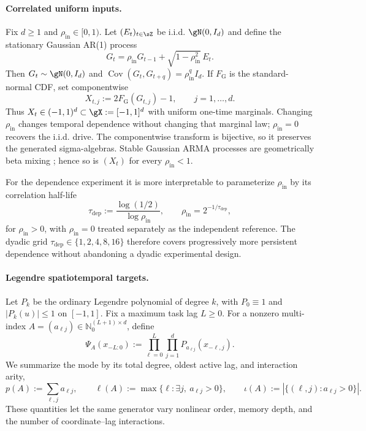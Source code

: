 \paragraph{Correlated uniform inputs.}
Fix $d\geq1$ and $\rho_{\mathrm{in}}\in[0,1)$.  Let
$(E_t)_{t\in\sZ}$ be i.i.d. $\gN(0,I_d)$ and define the stationary Gaussian
AR(1) process
\begin{equation}
    G_t=\rho_{\mathrm{in}}G_{t-1}
      +\sqrt{1-\rho_{\mathrm{in}}^2}\,E_t.
    \label{eq:empirical-gaussian-ar}
\end{equation}
Then $G_t\sim\gN(0,I_d)$ and
$\operatorname{Cov}(G_t,G_{t+q})=\rho_{\mathrm{in}}^qI_d$.  If
$F_{\mathrm G}$ is the standard-normal CDF, set componentwise
\begin{equation}
    X_{t,j}:=2F_{\mathrm G}(G_{t,j})-1,
    \qquad j=1,\ldots,d.
    \label{eq:empirical-uniform-transform}
\end{equation}
Thus $X_t\in(-1,1)^d\subset\gX:=[-1,1]^d$ with uniform one-time marginals.
Changing $\rho_{\mathrm{in}}$ changes temporal dependence without changing
that marginal law; $\rho_{\mathrm{in}}=0$ recovers the i.i.d. drive.  The
componentwise transform is bijective, so it preserves the generated
sigma-algebras.  Stable Gaussian ARMA processes are geometrically beta mixing
\citep{Mokkadem1988}; hence so is $(X_t)$ for every
$\rho_{\mathrm{in}}<1$.

For the dependence experiment it is more interpretable to parameterize
$\rho_{\mathrm{in}}$ by its correlation half-life
\begin{equation}
    \tau_{\mathrm{dep}}
    :=\frac{\log(1/2)}{\log \rho_{\mathrm{in}}},
    \qquad
    \rho_{\mathrm{in}}=2^{-1/\tau_{\mathrm{dep}}},
    \label{eq:dependence-half-life}
\end{equation}
for $\rho_{\mathrm{in}}>0$, with $\rho_{\mathrm{in}}=0$ treated separately as
the independent reference.  The dyadic grid
$\tau_{\mathrm{dep}}\in\{1,2,4,8,16\}$ therefore covers progressively more
persistent dependence without abandoning a dyadic experimental design.

\paragraph{Legendre spatiotemporal targets.}
Let $P_k$ be the ordinary Legendre polynomial of degree $k$, with
$P_0\equiv1$ and $|P_k(u)|\leq1$ on $[-1,1]$.  Fix a maximum task lag
$L\geq0$.  For a nonzero multi-index
$A=(a_{\ell j})\in\mathbb N_0^{(L+1)\times d}$, define
\begin{equation}
    \Psi_A(x_{-L:0})
    :=\prod_{\ell=0}^{L}\prod_{j=1}^{d}
      P_{a_{\ell j}}(x_{-\ell,j}).
    \label{eq:empirical-legendre-mode}
\end{equation}
We summarize the mode by its total degree, oldest active lag, and interaction
arity,
\[
    p(A):=\sum_{\ell,j}a_{\ell j},
    \qquad
    \ell(A):=\max\{\ell:\exists j,\ a_{\ell j}>0\},
    \qquad
    \iota(A):=|\{(\ell,j):a_{\ell j}>0\}|.
\]
These quantities let the same generator vary nonlinear order, memory depth,
and the number of coordinate--lag interactions.

